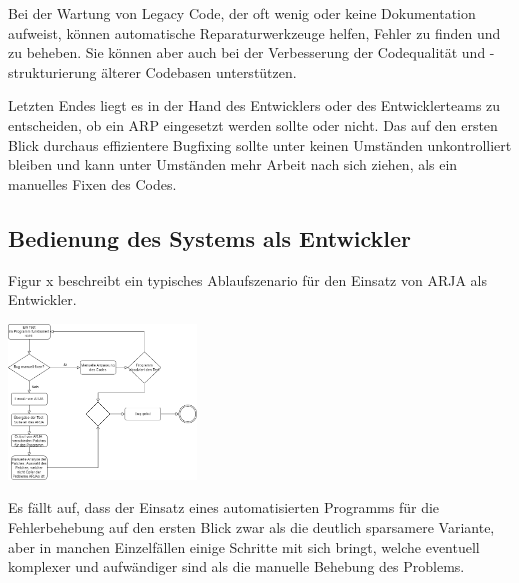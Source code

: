 \documentclass[11pt,a4paper]{article}
\begin{document}
Bei der Wartung von Legacy Code, der oft wenig oder keine Dokumentation aufweist, können automatische Reparaturwerkzeuge helfen, Fehler zu finden und zu beheben. Sie können aber auch bei der Verbesserung der Codequalität und -strukturierung älterer Codebasen unterstützen.

Letzten Endes liegt es in der Hand des Entwicklers oder des Entwicklerteams zu entscheiden, ob ein ARP eingesetzt werden sollte oder nicht. Das auf den ersten Blick durchaus effizientere Bugfixing sollte unter keinen Umständen unkontrolliert bleiben und kann unter Umständen mehr Arbeit nach sich ziehen, als ein manuelles Fixen des Codes.
\subsection{Bedienung des Systems als Entwickler}
Figur x beschreibt ein typisches Ablaufszenario für den Einsatz von ARJA als Entwickler.


\includegraphics[width=50mm,scale=0.5]{ablauf.png}

Es fällt auf, dass der Einsatz eines automatisierten Programms für die Fehlerbehebung auf den ersten Blick zwar als die deutlich sparsamere Variante, aber in manchen Einzelfällen einige Schritte mit sich bringt, welche eventuell komplexer und aufwändiger sind als die manuelle Behebung des Problems.








\end{document}
